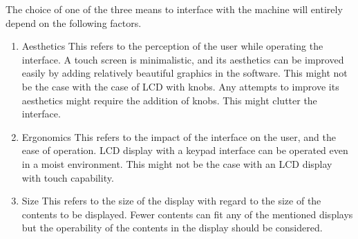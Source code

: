 The choice of one of the three means to interface with the machine will entirely depend on the following factors.

\begin{enumerate}
    \item Aesthetics \newline
    This refers to the perception of the user while operating the interface. A touch screen is minimalistic, and its aesthetics can be improved easily by adding relatively beautiful graphics in the software. This might not be the case with the case of LCD with knobs. Any attempts to improve its aesthetics might require the addition of knobs. This might clutter the interface.
    \item Ergonomics \newline
    This refers to the impact of the interface on the user, and the ease of operation. LCD display with a keypad interface can be operated even in a moist environment. This might not be the case with an LCD display with touch capability.    
    \item Size  \newline
    This refers to the size of the display with regard to the size of the contents to be displayed. Fewer contents can fit any of the mentioned displays but the operability of the contents in the display should be considered. 
\end{enumerate}